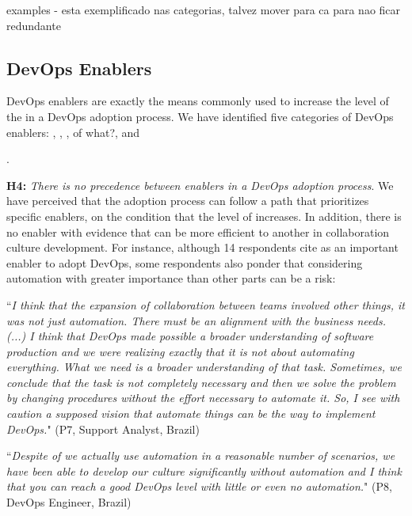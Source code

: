 {\color{red}examples - esta exemplificado nas categorias, talvez mover para ca
para nao ficar redundante}

\subsection{DevOps Enablers}

DevOps enablers are exactly the means commonly used to increase the level of
the  in a DevOps adoption process.
We have identified five categories of DevOps enablers:
, , ,
 {\color{red}of what?}, and {.

\textbf{H4:} \textit{There is no precedence between enablers in a DevOps
adoption process}. We have perceived that the adoption process can follow a
path that prioritizes specific enablers, on the condition that the level of
 increases. In addition, there is no enabler with evidence that
can be more efficient to another in collaboration culture development. For
instance, although 14 respondents cite  as an important
enabler to adopt DevOps, some respondents also ponder that considering
automation with greater importance than other parts can be a risk:

\begin{mq}
``\emph{I think that the expansion of collaboration between teams involved other
things, it was not just automation. There must be an alignment with the
business needs. (...) I think that DevOps made possible a broader understanding
of software production and we were realizing exactly that it is not about
automating everything. What we need is a broader understanding of that task.
Sometimes, we conclude that the task is not completely necessary and then we
solve the problem by changing procedures without the effort necessary to
automate it. So, I see with caution a supposed vision that automate things can
be the way to implement DevOps.}" (P7, Support Analyst, Brazil)
\end{mq}

\begin{mq}
``\emph{Despite of we actually use automation in a reasonable number of scenarios, we have been able to develop our culture significantly without automation and I think that you can reach a good DevOps level with little or even no automation.}" (P8, DevOps Engineer, Brazil)
\end{mq}

}
